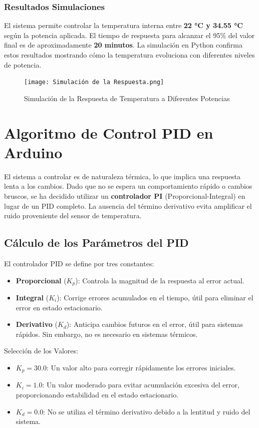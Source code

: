 \documentclass[spanish, a4paper, 11pt]{article}
\begin{document}
\subsubsection*{Resultados Simulaciones}

El sistema permite controlar la temperatura interna entre \textbf{22 °C y 34.55 °C} según la potencia aplicada. El tiempo de respuesta para alcanzar el 95\% del valor final es de aproximadamente \textbf{20 minutos}. La simulación en Python confirma estos resultados mostrando cómo la temperatura evoluciona con diferentes niveles de potencia.

\begin{figure}[ht]
    \centering
    \texttt{[image: Simulación de la Respuesta.png]}
    \caption{Simulación de la Respuesta de Temperatura a Diferentes Potencias}
\end{figure}
\FloatBarrier

\section{Algoritmo de Control PID en Arduino} 


El sistema a controlar es de naturaleza térmica, lo que implica una respuesta lenta a los cambios. Dado que no se espera un comportamiento rápido o cambios bruscos, se ha decidido utilizar un \textbf{controlador PI} (Proporcional-Integral) en lugar de un PID completo. La ausencia del término derivativo evita amplificar el ruido proveniente del sensor de temperatura.

\subsection{Cálculo de los Parámetros del PID}

El controlador PID se define por tres constantes:
\begin{itemize}
    \item \textbf{Proporcional} ($K_p$): Controla la magnitud de la respuesta al error actual.
    \item \textbf{Integral} ($K_i$): Corrige errores acumulados en el tiempo, útil para eliminar el error en estado estacionario.
    \item \textbf{Derivativo} ($K_d$): Anticipa cambios futuros en el error, útil para sistemas rápidos. Sin embargo, no es necesario en sistemas térmicos.
\end{itemize}

Selección de los Valores:
\begin{itemize}
    \item $K_p = 30.0$: Un valor alto para corregir rápidamente los errores iniciales.
    \item $K_i = 1.0$: Un valor moderado para evitar acumulación excesiva del error, proporcionando estabilidad en el estado estacionario.
    \item $K_d = 0.0$: No se utiliza el término derivativo debido a la lentitud y ruido del sistema.
\end{itemize}
\end{document}
